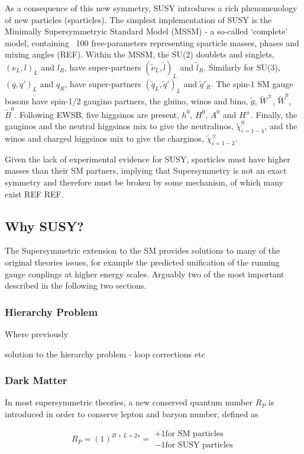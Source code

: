 As a consequence of this new symmetry, SUSY introduces a rich phenomenology of
new particles (sparticles). The simplest implementation of SUSY is the
Minimally
Supersymmetryic Standard Model (MSSM) - a so-called `complete' model, containing
~100 free-parameters representing sparticle masses, phases and mixing angles 
(REF).
Within the MSSM, the SU(2) doublets and singlets, $(\nu_L, l)_L$ and $l_R$,
have super-partners $(\tilde{\nu}_L, \tilde{l})_L$ and $\tilde{l}_R$. Similarly
for SU(3), $(q, q')_L$ and $q_R$,
have super-partners $(\tilde{q}_L, \tilde{q}')_L$ and $\tilde{q}'_R$. The
spin-1 SM gauge bosons have spin-1/2 gaugino partners, the gluino, winos and
bino, $\tilde{g}$, $\tilde{W}^{\pm}$, $\tilde{W}^0$, $\tilde{B}^0$.
Following EWSB, five higgsinos are present, $h^0$, $H^0$, $A^0$ and
$H^{\pm}$. Finally, the gauginos and the neutral higgsinos mix to give the
neutralinos, $\tilde{\chi}^0_{i=1-4}$, and the winos and charged higgsinos mix
to give the charginos, $\tilde{\chi}^{\pm}_{i=1-2}$.

Given the lack of experimental evidence for SUSY, sparticles must
have higher masses than their SM partners, implying that Supersymmetry is not
an exact symmetry and therefore must be broken by some mechanism, of which many
exist REF REF.

\subsection{Why SUSY?}
The Supersymmetric extension to the SM provides solutions to many of the
original theories issues, for example the predicted unification of the running
gauge couplings at higher energy scales. Arguably two of the most important
described in the following two sections.

\subsubsection{Hierarchy Problem}
Where previously 

solution to the hierarchy problem - loop corrections etc

\subsubsection{Dark Matter}
In most supersymmetric theories, a new conserved quantum number $R_P$
is introduced in order to conserve lepton and baryon number, defined as

\begin{equation}
R_P = (1)^{B+L+2s} =
\begin{array}{l} 
+1 \text{for SM particles}\\ -1 \text{for SUSY particles}
\end{array}
\end{equation}

